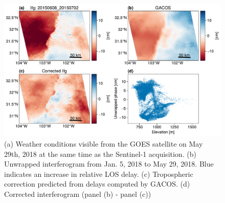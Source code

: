 

%



\begin{figure}
	\centering
	\includegraphics[width=1.0\textwidth]{figures/chapter2-sar/figure_tropo_correct_gacos_wave_ph_vs_el.pdf}
	\caption[West Texas tropospheric correction attempt for pressure front]{
		(a) Weather conditions visible from the GOES satellite on May 29th, 2018 at the same time as the Sentinel-1 acquisition.
		(b) Unwrapped interferogram from Jan. 5, 2018 to May 29, 2018. Blue indicates an increase in relative LOS delay.
		(c) Tropospheric correction predicted from delays computed by GACOS.
		(d) Corrected interferogram (panel (b) - panel (c))
	}
	\label{fig:ch2-tropo-correct-wave}
\end{figure}

